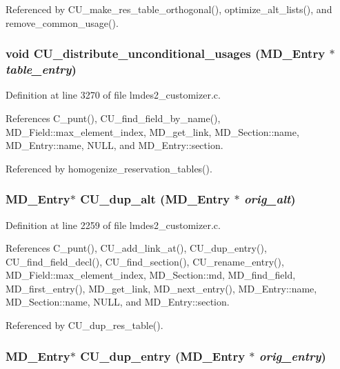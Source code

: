 Referenced by CU\_\-make\_\-res\_\-table\_\-orthogonal(), optimize\_\-alt\_\-lists(), and remove\_\-common\_\-usage().
\subsubsection{\setlength{\rightskip}{0pt plus 5cm}void CU\_\-distribute\_\-unconditional\_\-usages (\bf{MD\_\-Entry} $\ast$ {\em table\_\-entry})}\label{lmdes2__customizer_8c_edcc55f67d62d16fa42c8dc98dec4a43}




Definition at line 3270 of file lmdes2\_\-customizer.c.

References C\_\-punt(), CU\_\-find\_\-field\_\-by\_\-name(), MD\_\-Field::max\_\-element\_\-index, MD\_\-get\_\-link, MD\_\-Section::name, MD\_\-Entry::name, NULL, and MD\_\-Entry::section.

Referenced by homogenize\_\-reservation\_\-tables().
\subsubsection{\setlength{\rightskip}{0pt plus 5cm}\bf{MD\_\-Entry}$\ast$ CU\_\-dup\_\-alt (\bf{MD\_\-Entry} $\ast$ {\em orig\_\-alt})}\label{lmdes2__customizer_8c_21fc335b4dfe1e7941cdc26722a47457}




Definition at line 2259 of file lmdes2\_\-customizer.c.

References C\_\-punt(), CU\_\-add\_\-link\_\-at(), CU\_\-dup\_\-entry(), CU\_\-find\_\-field\_\-decl(), CU\_\-find\_\-section(), CU\_\-rename\_\-entry(), MD\_\-Field::max\_\-element\_\-index, MD\_\-Section::md, MD\_\-find\_\-field, MD\_\-first\_\-entry(), MD\_\-get\_\-link, MD\_\-next\_\-entry(), MD\_\-Entry::name, MD\_\-Section::name, NULL, and MD\_\-Entry::section.

Referenced by CU\_\-dup\_\-res\_\-table().
\subsubsection{\setlength{\rightskip}{0pt plus 5cm}\bf{MD\_\-Entry}$\ast$ CU\_\-dup\_\-entry (\bf{MD\_\-Entry} $\ast$ {\em orig\_\-entry})}\label{lmdes2__customizer_8c_0f5365fc4e33bb5f9ed676c4fbba9ea1}





